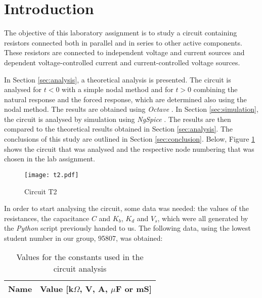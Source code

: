 \section{Introduction}
\label{sec:introduction}

The objective of this laboratory assignment is to study a circuit containing resistors connected both in parallel and in series to other active components. These resistors are connected to independent voltage and current sources and dependent voltage-controlled current and current-controlled voltage sources.


In Section \ref{sec:analysis}, a theoretical analysis is presented. The circuit is analysed for $t<0$ with a simple nodal method and for $t>0$ combining the natural response and the forced response, which are determined also using the nodal method. The results are obtained using \emph{Octave} \cite{bib:octave}. In Section \ref{sec:simulation}, the circuit is analysed by simulation using \emph{NgSpice} \cite{bib:ngspice}. The results are then compared to the theoretical results obtained in Section \ref{sec:analysis}. The conclusions of this study are outlined in Section \ref{sec:conclusion}. Below, Figure \ref{fig:t2circuit} shows the circuit that was analysed and the respective node numbering that was chosen in the lab assignment.

\begin{figure}[!htp] \centering
\texttt{[image: t2.pdf]}
\caption{Circuit T2}
\label{fig:t2circuit}
\end{figure}
\FloatBarrier

In order to start analysing the circuit, some data was needed: the values of the resistances, the capacitance $C$ and $K_b$, $K_d$ and $V_s$, which were all generated by the \emph{Python} script previously handed to us. The following data, using the lowest student number in our group, 95807, was obtained:

\begin{table}[h]                             

\centering                                  %
                        
\def\arraystretch{1.2}                       %
\begin{tabular}{c|c}                    %
\hline                                  %

\textbf{Name}  & \textbf{Value [k$\Omega$, V, A, $\mu$F or mS]}\\     

\hline                                %

\hline                                %
\end{tabular}   

\caption{Values for the constants used in the circuit analysis}
\label{tab1}   
\end{table}                             
\FloatBarrier
